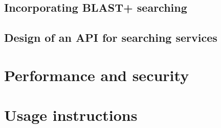\subsection{Incorporating BLAST+ searching}

\subsection{Design of an API for searching services}


\section{Performance and security}

\section{Usage instructions}

